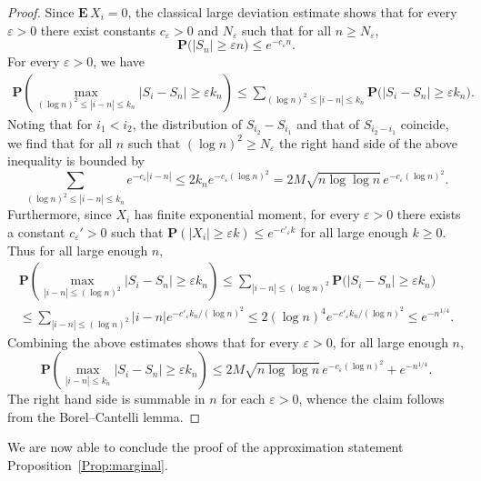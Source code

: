 \documentclass[AHL,Unicode,longabstracts,published]{cedram}
\newcommand{\e}{\varepsilon}
\newcommand{\Pb}{\mathbf{P}}
\newcommand{\Eb}{\mathbf{E}\,}
\renewcommand{\(}{\left(}
\renewcommand{\)}{\right)}
\begin{document}
\begin{proof}
Since $\Eb X_i=0$, the classical large deviation estimate shows that for every $\e>0$ there exist constants $c_\e>0$ and $N_\e$ such that for all $n \ge N_\e$,
\[
\Pb\big(|S_n| \ge \e n\big) \le e^{-c_\e n}.
\]
For every $\e>0$, we have
\begin{align*}
\Pb\left(\max_{(\log n)^2 \le |i-n| \le k_n} |S_i-S_n| \ge \e k_n\right)
\le \sum_{(\log n)^2 \le |i-n|\le k_n}\Pb\bigl(|S_i-S_n| \ge \e k_n\bigr).
\end{align*}
Noting that for $i_1<i_2$, the distribution of $S_{i_2}-S_{i_1}$ and that of $S_{i_2-i_1}$ coincide, we find that for all $n$ such that $(\log n)^2\ge N_\e$ the right hand side of the above inequality is bounded by
\[
\sum_{(\log n)^2 \le |i-n|\le k_n}e^{-c_\e |i-n|} \le 2 k_n e^{-c_\e (\log n)^2}=2M\sqrt{n \log \log n}\,e^{-c_\e (\log n)^2}.
\]
Furthermore, since $X_i$ has finite exponential moment, for every $\e>0$ there exists a constant $c_\e'>0$ such that $\Pb(|X_i|\ge \e k)\le e^{-c'_\e k}$ for all large enough $k \ge 0$. Thus for all large enough $n$,
\begin{multline*}
\Pb\left(\max_{|i-n|\le (\log n)^2}|S_i-S_n| \ge \e k_n\right)
\le \sum_{|i-n| \le (\log n)^2}\Pb\bigl(|S_i-S_n| \ge \e k_n\bigr)\\
\le \sum_{|i-n|\le (\log n)^2}|i-n|e^{-c'_\e k_n/(\log n)^2}\le 2(\log n)^4 e^{-c'_\e k_n/(\log n)^2}\le e^{-n^{1/4}}.
\end{multline*}
Combining the above estimates shows that for every $\e>0$, for all large enough $n$,
\[
\Pb\left(\max_{|i-n|\le k_n}|S_i-S_n| \ge \e k_n\right)\le 2M\sqrt{n \log \log n}\,e^{-c_\e (\log n)^2}+e^{-n^{1/4}}.
\]
The right hand side is summable in $n$ for each $\e>0$, whence the claim follows from the Borel--Cantelli lemma.
\end{proof}

We are now able to conclude the proof of the approximation statement Proposition~\ref{Prop:marginal}.
\end{document}
